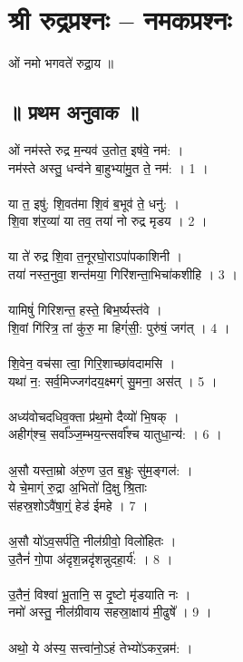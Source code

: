\section{श्री रुद्रप्रश्नः – नमकप्रश्नः}
ओं नमो भगवते॑ रुद्रा॒य ॥\\
\subsection{॥ प्रथम अनुवाक ॥}
ओं नम॑स्ते रुद्र म॒न्यव॑ उ॒तोत॒ इष॑वे॒ नम॑: ।\\
नम॑स्ते अस्तु॒ धन्व॑ने बा॒हुभ्या॑मु॒त ते॒ नम॑: । 1 ।\\
\\
या त॒ इषु॑: शि॒वत॑मा शि॒वं ब॒भूव॑ ते॒ धनु॑: ।\\
शि॒वा श॑र॒व्या॑ या तव॒ तया॑ नो रुद्र मृडय । 2 ।\\
\\
या ते॑ रुद्र शि॒वा त॒नूरघो॒राऽपा॑पकाशिनी ।\\
तया॑ नस्त॒नुवा॒ शन्त॑मया॒ गिरि॑शन्ता॒भिचा॑कशीहि । 3 ।\\
\\
यामिषुं॑ गिरिशन्त॒ हस्ते॒ बिभ॒र्ष्यस्त॑वे ।\\
शि॒वां गि॑रित्र॒ तां कु॑रु॒ मा हिग्ं॑सी॒: पुरु॑षं॒ जग॑त् । 4 ।\\
\\
शि॒वेन॒ वच॑सा त्वा॒ गिरि॒शाच्छा॑वदामसि ।\\
यथा॑ न॒: सर्व॒मिज्जग॑दय॒क्ष्मग्ं सु॒मना॒ अस॑त् । 5 ।\\
\\
अध्य॑वोचदधिव॒क्ता प्र॑थ॒मो दैव्यो॑ भि॒षक् ।\\
अहीग्॑श्च॒ सर्वा᳚ञ्ज॒म्भय॒न्त्सर्वा᳚श्च यातुधा॒न्य॑: । 6 ।\\
\\
अ॒सौ यस्ता॒म्रो अ॑रु॒ण उ॒त ब॒भ्रुः सु॑म॒ङ्गल॑: ।\\
ये चे॒माग्ं रु॒द्रा अ॒भितो॑ दि॒क्षु श्रि॒ताः\\
स॑हस्र॒शोऽवै॑षा॒ग्ं॒ हेड॑ ईमहे । 7 ।\\
\\
अ॒सौ यो॑ऽव॒सर्प॑ति॒ नील॑ग्रीवो॒ विलो॑हितः ।\\
उ॒तैनं॑ गो॒पा अ॑दृश॒न्नदृ॑शन्नुदहा॒र्य॑: । 8 ।\\
\\
उ॒तैनं॒ विश्वा॑ भू॒तानि॒ स दृ॒ष्टो मृ॑डयाति नः ।\\
नमो॑ अस्तु॒ नील॑ग्रीवाय सहस्रा॒क्षाय॑ मी॒ढुषे᳚ । 9 ।\\
\\
अथो॒ ये अ॑स्य॒ सत्त्वा॑नो॒ऽहं तेभ्यो॑ऽकर॒न्नम॑: ।\\
